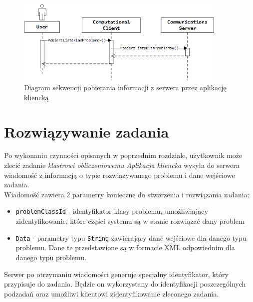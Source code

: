 \documentclass[12pt,a4paper,titlepage]{report}
\begin{document}
	\begin{figure}[h]
		\centering
		\caption{Diagram sekwencji pobierania informacji z serwera przez aplikację kliencką}
		\includegraphics[width=0.9\textwidth]{img/communication/problemclass.png}
	\end{figure}	
	
	\section{Rozwiązywanie zadania}
	
	Po wykonaniu czynności opisanych w poprzednim rozdziale, użytkownik może zlecić zadanie \textit{klastrowi obliczeniowemu}
    \textit{Aplikacja kliencka} wysyła do serwera wiadomość z informacją o typie rozwiązywanego problemu i dane wejściowe zadania.\\
    
    
    
     Wiadomość zawiera 2 parametry konieczne do stworzenia i rozwiązania zadania:
    \begin{itemize}
    	\item \verb+problemClassId+ - identyfikator klasy problemu, umożliwiający zidentyfikowanie, które części systemu są w stanie rozwiązać dany problem
    	\item \verb+Data+ - parametry typu \verb+String+ zawierający dane wejściowe dla danego typu problemu. Dane te przedstawione 
    					są w formacie XML odpowiednim dla danego typu problemu.  
    \end{itemize}
    
    Serwer po otrzymaniu wiadomości generuje specjalny identyfikator, który przypisuje do zadania. Będzie on wykorzystany do 
    identyfikacji poszczególnych podzadań oraz umożliwi klientowi zidentyfikowanie zleconego zadania.\\
    
    
    
\end{document}
